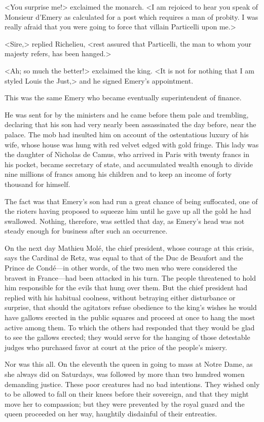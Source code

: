 <You surprise me!> exclaimed the monarch. <I am rejoiced to hear you speak of Monsieur d'Emery as calculated for a post which requires a man of probity. I was really afraid that you were going to force that villain Particelli upon me.>

<Sire,> replied Richelieu, <rest assured that Particelli, the man to whom your majesty refers, has been hanged.>

<Ah; so much the better!> exclaimed the king. <It is not for nothing that I am styled Louis the Just,> and he signed Emery's appointment.

This was the same Emery who became eventually superintendent of finance.

He was sent for by the ministers and he came before them pale and trembling, declaring that his son had very nearly been assassinated the day before, near the palace. The mob had insulted him on account of the ostentatious luxury of his wife, whose house was hung with red velvet edged with gold fringe. This lady was the daughter of Nicholas de Camus, who arrived in Paris with twenty francs in his pocket, became secretary of state, and accumulated wealth enough to divide nine millions of francs among his children and to keep an income of forty thousand for himself.

The fact was that Emery's son had run a great chance of being suffocated, one of the rioters having proposed to squeeze him until he gave up all the gold he had swallowed. Nothing, therefore, was settled that day, as Emery's head was not steady enough for business after such an occurrence.

On the next day Mathieu Molé, the chief president, whose courage at this crisis, says the Cardinal de Retz, was equal to that of the Duc de Beaufort and the Prince de Condé—in other words, of the two men who were considered the bravest in France—had been attacked in his turn. The people threatened to hold him responsible for the evils that hung over them. But the chief president had replied with his habitual coolness, without betraying either disturbance or surprise, that should the agitators refuse obedience to the king's wishes he would have gallows erected in the public squares and proceed at once to hang the most active among them. To which the others had responded that they would be glad to see the gallows erected; they would serve for the hanging of those detestable judges who purchased favor at court at the price of the people's misery.

Nor was this all. On the eleventh the queen in going to mass at Notre Dame, as she always did on Saturdays, was followed by more than two hundred women demanding justice. These poor creatures had no bad intentions. They wished only to be allowed to fall on their knees before their sovereign, and that they might move her to compassion; but they were prevented by the royal guard and the queen proceeded on her way, haughtily disdainful of their entreaties.

